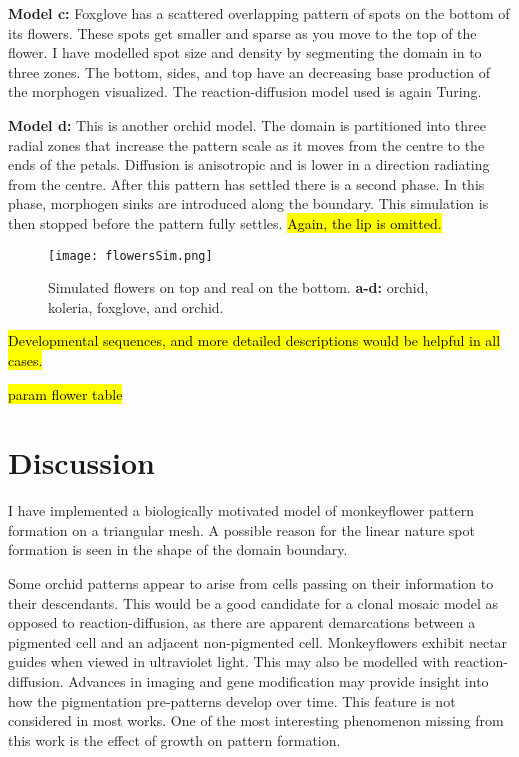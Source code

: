 \textbf{Model c:}
Foxglove has a scattered overlapping pattern of spots on the bottom of its flowers. These spots get smaller and sparse as you move to the top of the flower. I have modelled spot size and density by segmenting the domain in to three zones. The bottom, sides, and top have an decreasing base production of the morphogen visualized. The reaction-diffusion model used is again Turing.

\textbf{Model d:}
This is another orchid model. The domain is partitioned into three radial zones that increase the pattern scale as it moves from the centre to the ends of the petals. Diffusion is anisotropic and is lower in a direction radiating from the centre. After this pattern has settled there is a second phase. In this phase, morphogen sinks are introduced along the boundary. This simulation is then stopped before the pattern fully settles. \hl{Again, the lip is omitted.}

\begin{figure}[ht]
	\centering
	\texttt{[image: flowersSim.png]}
	\caption{Simulated flowers on top and real on the bottom. \textbf{a-d:} orchid, koleria, foxglove, and orchid.}
	\label{fig:orchids}
\end{figure}

\hl{Developmental sequences, and more detailed descriptions would be helpful in all cases.}

\hl{param flower table}

\section{Discussion}

I have implemented a biologically motivated model of monkeyflower pattern formation on a triangular mesh. A possible reason for the linear nature spot formation is seen in the shape of the domain boundary. 

Some orchid patterns appear to arise from cells passing on their information to their descendants. This would be a good candidate for a clonal mosaic \cite{korn2007} model as opposed to reaction-diffusion, as there are apparent demarcations between a pigmented cell and an adjacent non-pigmented cell. Monkeyflowers exhibit nectar guides when viewed in ultraviolet light. This may also be modelled with reaction-diffusion. Advances in imaging and gene modification may provide insight into how the pigmentation pre-patterns develop over time. This feature is not considered in most works. One of the most interesting phenomenon missing from this work is the effect of growth on pattern formation.